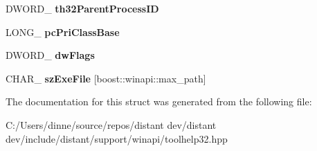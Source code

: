 \begin{DoxyCompactItemize}
\item 
\mbox{\label{structboost_1_1winapi_1_1tag_p_r_o_c_e_s_s_e_n_t_r_y32___ad43b5f29ad60f685f26b3d8c0021784a}} 
D\+W\+O\+R\+D\+\_\+ {\bfseries th32\+Parent\+Process\+ID}
\item 
\mbox{\label{structboost_1_1winapi_1_1tag_p_r_o_c_e_s_s_e_n_t_r_y32___a1a565e99cc91271290af89e00d01e804}} 
L\+O\+N\+G\+\_\+ {\bfseries pc\+Pri\+Class\+Base}
\item 
\mbox{\label{structboost_1_1winapi_1_1tag_p_r_o_c_e_s_s_e_n_t_r_y32___afa52672c60b3c165097e9f211e2e81f5}} 
D\+W\+O\+R\+D\+\_\+ {\bfseries dw\+Flags}
\item 
\mbox{\label{structboost_1_1winapi_1_1tag_p_r_o_c_e_s_s_e_n_t_r_y32___a4d35f492f27d02b266685b7ef559408a}} 
C\+H\+A\+R\+\_\+ {\bfseries sz\+Exe\+File} \mbox{[}boost\+::winapi\+::max\+\_\+path\mbox{]}
\end{DoxyCompactItemize}


The documentation for this struct was generated from the following file\+:\begin{DoxyCompactItemize}
\item 
C\+:/\+Users/dinne/source/repos/distant dev/distant dev/include/distant/support/winapi/toolhelp32.\+hpp\end{DoxyCompactItemize}
